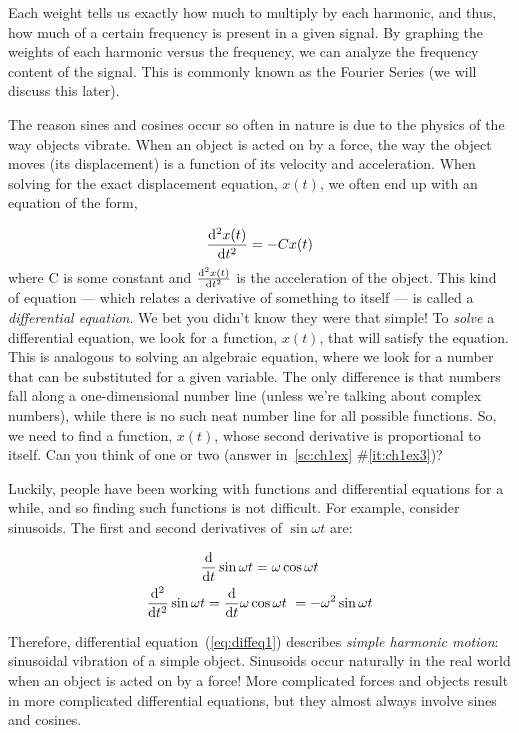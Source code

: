 Each weight tells us exactly how much to multiply by each harmonic, and thus, how much of a certain frequency is present in a given signal. By graphing the weights of each harmonic versus the frequency, we can analyze the frequency content of the signal. This is commonly known as the Fourier Series (we will discuss this later). 

The reason sines and cosines occur so often in nature is due to the physics of the way objects vibrate. When an object is acted on by a force, the way the object moves (its displacement) is a function of its velocity and acceleration. When solving for the exact displacement equation, $x(t)$, we often end up with an equation of the form,

\begin{equation}
\frac{\mathrm{d}^{2} x(t)}{\mathrm{d} t^{2}} = -C x(t) \label{eq:diffeq1}
\end{equation}
where C is some constant and $\frac{\mathrm{d}^{2} x(t)}{\mathrm{d} t^{2}} $ is the acceleration of the object. This kind of equation --- which relates a derivative of
something to itself --- is called a \emph{differential equation}. We
bet you didn't know they were that simple! To \emph{solve} a
differential equation, we look for a function, $x(t)$, that will satisfy the equation. This is analogous to
solving an algebraic equation, where we look for a number that
can be substituted for a given variable.  
The only difference is that numbers fall along a
one-dimensional number line (unless we're talking about complex
numbers), while there is no such neat number line for all possible functions.  So, we
need to find a function, $x(t)$, whose second derivative is proportional
to itself. Can you think of one or two (answer in~\ref{sc:ch1ex}
\#\ref{it:ch1ex3})?

Luckily, people have been working with functions and differential
equations for a while, and so finding such functions is not
difficult.  For example, consider sinusoids.  The first and second
derivatives of $\sin\omega t$ are:

\begin{gather}
\frac{\mathrm{d} }{\mathrm{d} t} \sin\omega t = \omega\cos\omega t\\
\frac{\mathrm{d}^{2} }{\mathrm{d} t^{2}} \sin\omega t = \frac{\mathrm{d} }{\mathrm{d} t} \omega\cos\omega t\
   = -\omega^2 \sin\omega t
\end{gather}

Therefore, differential equation~(\ref{eq:diffeq1}) describes
\emph{simple harmonic motion}: sinusoidal vibration of a simple object. 
Sinusoids occur naturally in the real world when an object is acted on by a force! More complicated forces and objects result in more complicated differential equations, but they almost always involve sines and cosines.

